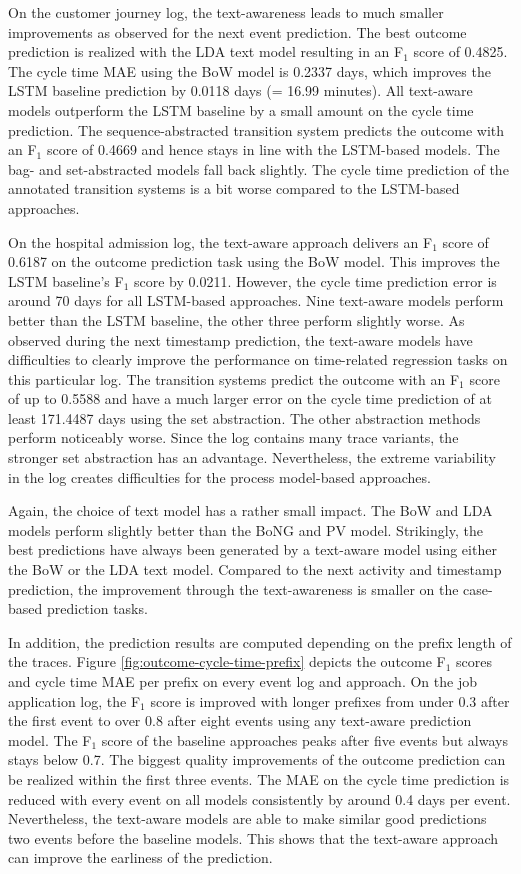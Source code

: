 On the customer journey log, the text-awareness leads to much smaller improvements as observed for the next event prediction.
The best outcome prediction is realized with the LDA text model resulting in an F$_1$ score of 0.4825.
The cycle time MAE using the BoW model is 0.2337 days, which improves the LSTM baseline prediction by 0.0118 days (= 16.99 minutes).
All text-aware models outperform the LSTM baseline by a small amount on the cycle time prediction.
The sequence-abstracted transition system predicts the outcome with an F$_1$ score of 0.4669 and hence stays in line with the LSTM-based models.
The bag- and set-abstracted models fall back slightly.
The cycle time prediction of the annotated transition systems is a bit worse compared to the LSTM-based approaches.

On the hospital admission log, the text-aware approach delivers an F$_1$ score of 0.6187 on the outcome prediction task using the BoW model.
This improves the LSTM baseline's F$_1$ score by 0.0211.
However, the cycle time prediction error is around 70 days for all LSTM-based approaches.
Nine text-aware models perform better than the LSTM baseline, the other three perform slightly worse.
As observed during the next timestamp prediction, the text-aware models have difficulties to clearly improve the performance on time-related regression tasks on this particular log.
The transition systems predict the outcome with an F$_1$ score of up to 0.5588 and have a much larger error on the cycle time prediction of at least 171.4487 days using the set abstraction.
The other abstraction methods perform noticeably worse.
Since the log contains many trace variants, the stronger set abstraction has an advantage.
Nevertheless, the extreme variability in the log creates difficulties for the process model-based approaches.

Again, the choice of text model has a rather small impact.
The BoW and LDA models perform slightly better than the BoNG and PV model.
Strikingly, the best predictions have always been generated by a text-aware model using either the BoW or the LDA text model.
Compared to the next activity and timestamp prediction, the improvement through the text-awareness is smaller on the case-based prediction tasks.

In addition, the prediction results are computed depending on the prefix length of the traces.
Figure \ref{fig:outcome-cycle-time-prefix} depicts the outcome F$_1$ scores and cycle time MAE per prefix on every event log and approach.
On the job application log, the F$_1$ score is improved with longer prefixes from under 0.3 after the first event to over 0.8 after eight events using any text-aware prediction model.
The F$_1$ score of the baseline approaches peaks after five events but always stays below 0.7.
The biggest quality improvements of the outcome prediction can be realized within the first three events.
The MAE on the cycle time prediction is reduced with every event on all models consistently by around 0.4 days per event.
Nevertheless, the text-aware models are able to make similar good predictions two events before the baseline models.
This shows that the text-aware approach can improve the earliness of the prediction.

